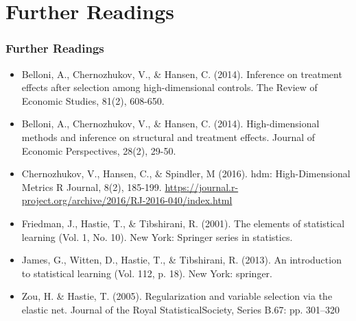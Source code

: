 \documentclass[
  shownotes,
  xcolor={svgnames},
  hyperref={colorlinks,citecolor=DarkBlue,linkcolor=DarkRed,urlcolor=DarkBlue}
  , aspectratio=169]{beamer}
\begin{document}
\section{Further Readings}
\begin{frame}
\frametitle{Further Readings}
\scriptsize
\begin{itemize}

  \item Belloni, A., Chernozhukov, V., \& Hansen, C. (2014). Inference on treatment effects after selection among high-dimensional controls. The Review of Economic Studies, 81(2), 608-650.
  \medskip
  \item Belloni, A., Chernozhukov, V., \& Hansen, C. (2014). High-dimensional methods and inference on structural and treatment effects. Journal of Economic Perspectives, 28(2), 29-50.
  \medskip
  \item Chernozhukov, V.,  Hansen, C., \& Spindler, M (2016). hdm: High-Dimensional Metrics R Journal, 8(2), 185-199.  \url{https://journal.r-project.org/archive/2016/RJ-2016-040/index.html}
  \item Friedman, J., Hastie, T., \& Tibshirani, R. (2001). The elements of statistical learning (Vol. 1, No. 10). New York: Springer series in statistics.
  \medskip
  \item James, G., Witten, D., Hastie, T., \& Tibshirani, R. (2013). An introduction to statistical learning (Vol. 112, p. 18). New York: springer.
  \medskip
  \item Zou, H. \& Hastie, T. (2005). Regularization and variable selection via the elastic net. Journal of the Royal StatisticalSociety, Series B.67: pp. 301–320
\end{itemize}

\end{frame}






\end{document}
